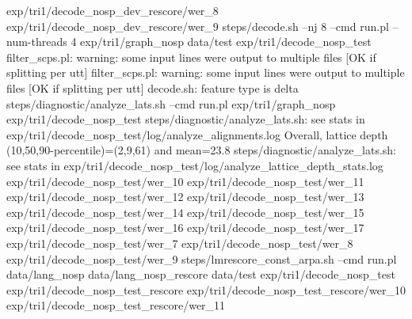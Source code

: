 exp/tri1/decode_nosp_dev_rescore/wer_8
exp/tri1/decode_nosp_dev_rescore/wer_9
steps/decode.sh --nj 8 --cmd run.pl --num-threads 4 exp/tri1/graph_nosp data/test exp/tri1/decode_nosp_test
filter_scps.pl: warning: some input lines were output to multiple files [OK if splitting per utt] 
filter_scps.pl: warning: some input lines were output to multiple files [OK if splitting per utt] 
decode.sh: feature type is delta
steps/diagnostic/analyze_lats.sh --cmd run.pl exp/tri1/graph_nosp exp/tri1/decode_nosp_test
steps/diagnostic/analyze_lats.sh: see stats in exp/tri1/decode_nosp_test/log/analyze_alignments.log
Overall, lattice depth (10,50,90-percentile)=(2,9,61) and mean=23.8
steps/diagnostic/analyze_lats.sh: see stats in exp/tri1/decode_nosp_test/log/analyze_lattice_depth_stats.log
exp/tri1/decode_nosp_test/wer_10
exp/tri1/decode_nosp_test/wer_11
exp/tri1/decode_nosp_test/wer_12
exp/tri1/decode_nosp_test/wer_13
exp/tri1/decode_nosp_test/wer_14
exp/tri1/decode_nosp_test/wer_15
exp/tri1/decode_nosp_test/wer_16
exp/tri1/decode_nosp_test/wer_17
exp/tri1/decode_nosp_test/wer_7
exp/tri1/decode_nosp_test/wer_8
exp/tri1/decode_nosp_test/wer_9
steps/lmrescore_const_arpa.sh --cmd run.pl data/lang_nosp data/lang_nosp_rescore data/test exp/tri1/decode_nosp_test exp/tri1/decode_nosp_test_rescore
exp/tri1/decode_nosp_test_rescore/wer_10
exp/tri1/decode_nosp_test_rescore/wer_11
